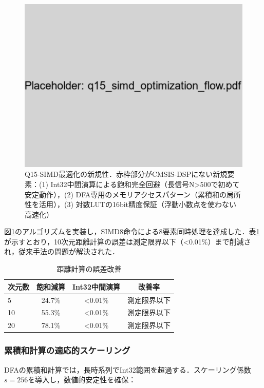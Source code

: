 \documentclass[paper]{ieice}
\begin{document}
\begin{figure}[t]
\centering
\includegraphics[width=0.85\linewidth]{q15_simd_optimization_flow.pdf}
\caption{Q15-SIMD最適化の新規性．赤枠部分がCMSIS-DSPにない新規要素：(1) Int32中間演算による飽和完全回避（長信号N>500で初めて安定動作），(2) DFA専用のメモリアクセスパターン（累積和の局所性を活用），(3) 対数LUTの16bit精度保証（浮動小数点を使わない高速化）}
\label{fig:flowchart}
\end{figure}

図\ref{fig:flowchart}のアルゴリズムを実装し，SIMD8命令による8要素同時処理を達成した．表\ref{tab:distance_error}が示すとおり，10次元距離計算の誤差は測定限界以下（<0.01\%）まで削減され，従来手法の問題が解決された．

\begin{table}[t]
\caption{距離計算の誤差改善}
\label{tab:distance_error}
\centering
\begin{tabular}{lccc}
\toprule
次元数 & 飽和減算 & Int32中間演算 & 改善率 \\
\midrule
5 & 24.7\% & <0.01\% & 測定限界以下 \\
10 & 55.3\% & <0.01\% & 測定限界以下 \\
20 & 78.1\% & <0.01\% & 測定限界以下 \\
\bottomrule
\end{tabular}
\end{table}

\subsubsection{累積和計算の適応的スケーリング}
DFAの累積和計算では，長時系列でInt32範囲を超過する．スケーリング係数$s=256$を導入し，数値的安定性を確保：
\end{document}
